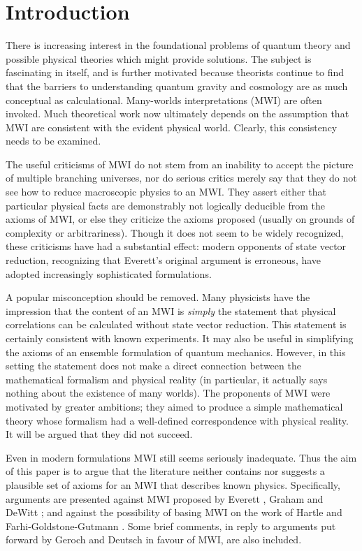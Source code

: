 \documentclass[aps,pra,12pt]{revtex4}
\begin{document}
\eject
\section{Introduction}

There is increasing interest in the foundational problems of quantum theory and
possible physical theories which might provide solutions.  
The subject is fascinating in itself, and is further motivated because
theorists continue to find that the barriers to understanding 
quantum gravity and cosmology are as much conceptual as calculational.  
Many-worlds interpretations (MWI) are often invoked.  Much theoretical work now
ultimately depends on the assumption that MWI are consistent with the
evident physical world.  Clearly, this consistency needs to be
examined.

The useful criticisms of MWI do not stem from an inability to accept
the picture of multiple branching universes, nor do serious critics
merely say that they do not see how to reduce macroscopic physics to
an MWI.  They assert either that particular physical facts are
demonstrably not logically deducible from the axioms of MWI, or else
they criticize the axioms proposed (usually on grounds of complexity
or arbitrariness).  Though it does not seem to be widely recognized,
these criticisms have had a substantial effect: modern opponents of
state vector reduction, recognizing that Everett's original argument
is erroneous, have adopted increasingly sophisticated formulations.

A popular misconception should be removed.  Many physicists have the
impression that the content of an MWI is {\em simply} the statement
that physical correlations can be calculated without state vector
reduction.  This statement is certainly consistent with known
experiments.  It may also be useful in simplifying the axioms of an
ensemble formulation of quantum mechanics.  
However, in this setting the statement does not
make a direct connection between the mathematical formalism and
physical reality (in particular, it actually says nothing about the
existence of many worlds).  The proponents of MWI were
motivated by greater ambitions; they aimed to produce a simple
mathematical theory whose formalism had a well-defined correspondence
with physical reality.  It will be argued that they did not succeed.

Even in modern formulations MWI still seems
seriously inadequate.
Thus the aim of this paper is to argue that the literature neither contains 
nor suggests a plausible set of axioms for an MWI that describes
known physics. 
Specifically, arguments are presented against
MWI proposed by Everett \cite{ev}, Graham \cite{gr} and
DeWitt \cite{dew}; and against the possibility of basing MWI on the
work of Hartle \cite{har} and Farhi-Goldstone-Gutmann \cite{fgg}. Some
brief comments, in reply to arguments put forward by Geroch \cite{ger}
and Deutsch \cite{deutsch} in favour of MWI, are also included.
\end{document}
